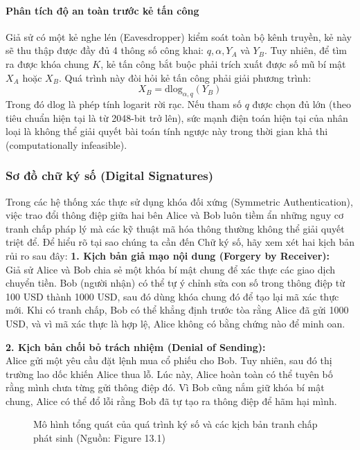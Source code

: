 \paragraph*{Phân tích độ an toàn trước kẻ tấn công}
Giả sử có một kẻ nghe lén (Eavesdropper) kiểm soát toàn bộ kênh truyền, kẻ này sẽ thu thập được đầy đủ 4 thông số công khai: $q, \alpha, Y_A$ và $Y_B$. Tuy nhiên, để tìm ra được khóa chung $K$, kẻ tấn công bắt buộc phải trích xuất được số mũ bí mật $X_A$ hoặc $X_B$. Quá trình này đòi hỏi kẻ tấn công phải giải phương trình:
$$X_B = \mathrm{dlog}_{\alpha, q}(Y_B)$$
Trong đó $\mathrm{dlog}$ là phép tính logarit rời rạc. Nếu tham số $q$ được chọn đủ lớn (theo tiêu chuẩn hiện tại là từ 2048-bit trở lên), sức mạnh điện toán hiện tại của nhân loại là không thể giải quyết bài toán tính ngược này trong thời gian khả thi (computationally infeasible).

\subsubsection*{Sơ đồ chữ ký số (Digital Signatures)}

Trong các hệ thống xác thực sử dụng khóa đối xứng (Symmetric Authentication), việc trao đổi thông điệp giữa hai bên Alice và Bob luôn tiềm ẩn những nguy cơ tranh chấp pháp lý mà các kỹ thuật mã hóa thông thường không thể giải quyết triệt để. Để hiểu rõ tại sao chúng ta cần đến Chữ ký số, hãy xem xét hai kịch bản rủi ro sau đây:
\textbf{1. Kịch bản giả mạo nội dung (Forgery by Receiver):} \\
Giả sử Alice và Bob chia sẻ một khóa bí mật chung để xác thực các giao dịch chuyển tiền. Bob (người nhận) có thể tự ý chỉnh sửa con số trong thông điệp từ 100 USD thành 1000 USD, sau đó dùng khóa chung đó để tạo lại mã xác thực mới. Khi có tranh chấp, Bob có thể khẳng định trước tòa rằng Alice đã gửi 1000 USD, và vì mã xác thực là hợp lệ, Alice không có bằng chứng nào để minh oan.

\textbf{2. Kịch bản chối bỏ trách nhiệm (Denial of Sending):} \\
Alice gửi một yêu cầu đặt lệnh mua cổ phiếu cho Bob. Tuy nhiên, sau đó thị trường lao dốc khiến Alice thua lỗ. Lúc này, Alice hoàn toàn có thể tuyên bố rằng mình chưa từng gửi thông điệp đó. Vì Bob cũng nắm giữ khóa bí mật chung, Alice có thể đổ lỗi rằng Bob đã tự tạo ra thông điệp để hãm hại mình.

\begin{figure}[htbp]
    \centering
    \caption{Mô hình tổng quát của quá trình ký số và các kịch bản tranh chấp phát sinh (Nguồn: Figure 13.1)}
    \label{fig:digital_signature_model}
\end{figure}

